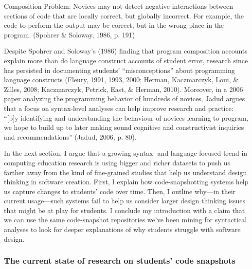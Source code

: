 Composition Problem: Novices may not detect negative interactions
between sections of code that are locally correct, but globally
incorrect. For example, the code to perform the output may be correct,
but in the wrong place in the program. (Spohrer \& Soloway, 1986, p.
191)

Despite Spohrer and Soloway's (1986) finding that program composition
accounts explain more than do language construct accounts of student
error, research since has persisted in documenting students'
``misconceptions'' about programming language constructs (Fleury, 1991,
1993, 2000; Herman, Kaczmarczyk, Loui, \& Zilles, 2008; Kaczmarczyk,
Petrick, East, \& Herman, 2010). Moreover, in a 2006 paper analyzing the
programming behavior of hundreds of novices, Jadud argues that a focus
on syntax-level analyses can help improve research and practice:
``{[}b{]}y identifying and understanding the behaviour of novices
learning to program, we hope to build up to later making sound cognitive
and constructivist inquiries and recommendations'' (Jadud, 2006, p. 80).

In the next section, I argue that a growing syntax- and language-focused
trend in computing education research is using bigger and richer
datasets to push us farther away from the kind of fine-grained studies
that help us understand design thinking in software creation. First, I
explain how code-snapshotting systems help us capture changes to
students' code over time. Then, I outline why---in their current
usage---such systems fail to help us consider larger design thinking
issues that might be at play for students. I conclude my introduction
with a claim that we can use the same code-snapshot repositories we've
been mining for syntactical analyses to look for deeper explanations of
why students struggle with software design.

\subsubsection{The current state of research on students' code
snapshots}\label{the-current-state-of-research-on-students-code-snapshots}

